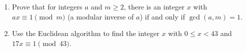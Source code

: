 \begin{enumerate}
\item[(a)] Prove that for integers $a$ and $m\ge2$, there is an integer $x$ with $ax\equiv1\pmod m$ (a modular inverse of $a$) if and only if $\gcd(a,m)=1$.
\item[(b)] Use the Euclidean algorithm to find the integer $x$ with $0\le x<43$ and $17x\equiv1\pmod{43}$.
\end{enumerate}
